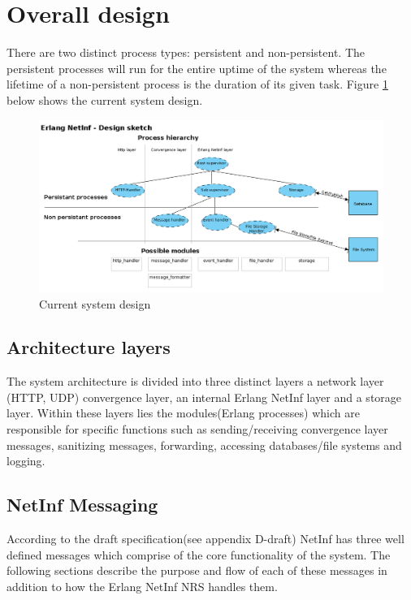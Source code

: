 \section {Overall design}

There are two distinct process types: persistent and non-persistent. The persistent processes will run for the entire uptime of the system whereas the lifetime of a non-persistent process is the duration of its given task. Figure \ref{fig:processhi} below shows the current system design.

\begin{figure}[h!]
	\centering
\includegraphics[scale=0.6]{./img/process_hierarchy.png}
\caption{Current system design}
\label{fig:processhi}
\end{figure}

\subsection{Architecture layers}

The system architecture is divided into three distinct layers a network layer (HTTP, UDP) convergence layer, an internal Erlang NetInf layer and a storage layer. Within these layers lies the modules(Erlang processes) which are responsible for specific functions such as sending/receiving convergence layer messages, sanitizing messages, forwarding, accessing databases/file systems and logging.

\subsection{NetInf Messaging}

According to the draft specification(see appendix D-draft) NetInf has three well defined messages which comprise of the core functionality of the system. The following sections describe the purpose and flow of each of these messages in addition to how the Erlang NetInf NRS handles them.

